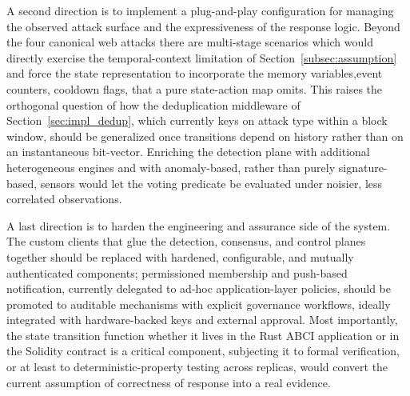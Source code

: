 A second direction is to implement a plug-and-play configuration for managing the observed attack surface and the expressiveness of the response logic. Beyond the four canonical web attacks there are multi-stage scenarios which would directly exercise the temporal-context limitation of Section~\ref{subsec:assumption} and force the state representation to incorporate the memory variables,event counters, cooldown flags, that a pure state-action map omits. This raises the orthogonal question of how the deduplication middleware of Section~\ref{sec:impl_dedup}, which currently keys on attack type within a block window, should be generalized once transitions depend on history rather than on an instantaneous bit-vector. Enriching the detection plane with additional heterogeneous engines and with anomaly-based, rather than purely signature-based, sensors would let the voting predicate be evaluated under noisier, less correlated observations.

A last direction is to harden the engineering and assurance side of the system. The custom clients that glue the detection, consensus, and control planes together should be replaced with hardened, configurable, and mutually authenticated components; permissioned membership and push-based notification, currently delegated to ad-hoc application-layer policies, should be promoted to auditable mechanisms with explicit governance workflows, ideally integrated with hardware-backed keys and external approval. Most importantly, the state transition function whether it lives in the Rust ABCI application or in the Solidity contract is a critical component, subjecting it to formal verification, or at least to deterministic-property testing across replicas, would convert the current assumption of correctness of response into a real evidence. 

